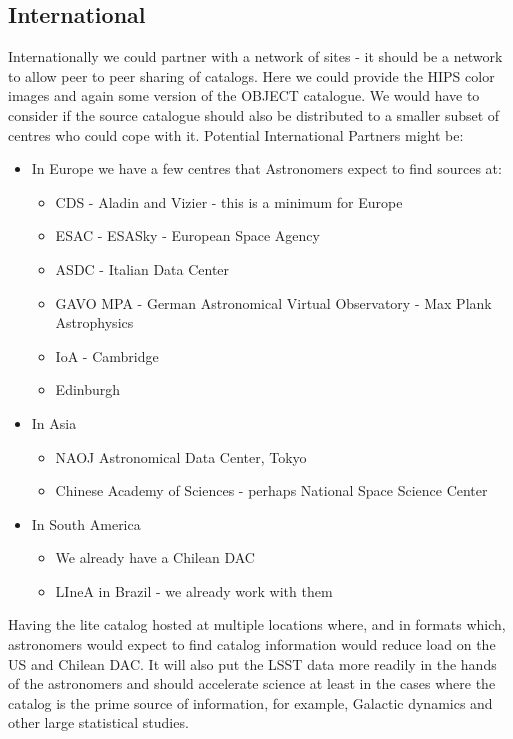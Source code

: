 \subsection {International}
Internationally we could partner with a network of sites - it should be a network to allow peer to peer sharing of catalogs. Here we could provide the HIPS color images and again some version of the OBJECT catalogue. We would have to consider if the source catalogue should also be distributed to a smaller subset of centres who could cope with it.
Potential International Partners might be:

\begin{itemize}
\item In Europe we have a few centres that Astronomers expect to find sources at:
\begin{itemize}
    \item CDS  - Aladin and Vizier - this is a minimum for Europe
    \item ESAC - ESASky - European Space Agency
    \item  ASDC - Italian Data Center
    \item  GAVO MPA - German Astronomical Virtual Observatory - Max Plank Astrophysics
    \item  IoA - Cambridge
    \item  Edinburgh
\end{itemize}
\item In Asia
\begin{itemize}
    \item  NAOJ Astronomical Data Center, Tokyo
    \item  Chinese Academy of Sciences - perhaps National Space Science Center
\end{itemize}
\item In South America
\begin{itemize}
    \item We already have a Chilean DAC
    \item LIneA in Brazil - we already work with them
\end{itemize}
\end{itemize}

Having the lite catalog hosted at multiple locations where, and in formats which, astronomers would expect to find catalog information would reduce load on the US and Chilean DAC. It will also put the LSST data more readily in the hands of the astronomers and should accelerate science at least in the cases where the catalog is the prime source of information, for example, Galactic dynamics and other large statistical studies.
